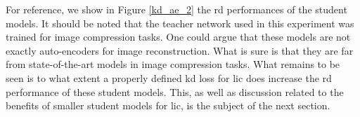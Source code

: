 \begin{figure}[H]
    \centering
    \qquad
    \caption[]{}
    \label{kd_ae_1}
\end{figure}

For reference, we show in Figure \ref{kd_ae_2} the \acrshort{rd} performances of the student models. It should be noted that the teacher network used in this experiment was trained for image compression tasks. One could argue that these models are not exactly auto-encoders for image reconstruction. What is sure is that they are far from state-of-the-art models in image compression tasks. What remains to be seen is to what extent a properly defined \acrshort{kd} loss for \acrshort{lic} does increase the \acrshort{rd} performance of these student models. This, as well as discussion related to the benefits of smaller student models for \acrshort{lic}, is the subject of the next section.

